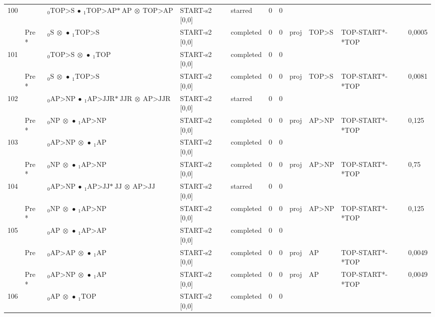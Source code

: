 \documentclass[10pt]{article}
\begin{document}
\begin{longtable}[htbp]{lllllllllll}
100 & & $ {}_0 \textrm{TOP>S} \  \bullet \ {}_{1} \textrm{TOP>AP*} \ \textrm{AP} \  \otimes \ \textrm{TOP>AP} $ & START-s2 [0,0] & starred & 0 & 0 & & & & \\ 
 & Pre *& $ {}_0 \textrm{S} \  \otimes \  \bullet \ {}_{1} \textrm{TOP>S} $ & START-s2 [0,0] & completed & 0 & 0 & proj & TOP>S & TOP-START*-*TOP & 0,0005 \\ 
101 & & $ {}_0 \textrm{TOP>S} \  \otimes \  \bullet \ {}_{1} \textrm{TOP} $ & START-s2 [0,0] & completed & 0 & 0 & & & & \\ 
 & Pre *& $ {}_0 \textrm{S} \  \otimes \  \bullet \ {}_{1} \textrm{TOP>S} $ & START-s2 [0,0] & completed & 0 & 0 & proj & TOP>S & TOP-START*-*TOP & 0,0081 \\ 
102 & & $ {}_0 \textrm{AP>NP} \  \bullet \ {}_{1} \textrm{AP>JJR*} \ \textrm{JJR} \  \otimes \ \textrm{AP>JJR} $ & START-s2 [0,0] & starred & 0 & 0 & & & & \\ 
 & Pre *& $ {}_0 \textrm{NP} \  \otimes \  \bullet \ {}_{1} \textrm{AP>NP} $ & START-s2 [0,0] & completed & 0 & 0 & proj & AP>NP & TOP-START*-*TOP & 0,125 \\ 
103 & & $ {}_0 \textrm{AP>NP} \  \otimes \  \bullet \ {}_{1} \textrm{AP} $ & START-s2 [0,0] & completed & 0 & 0 & & & & \\ 
 & Pre *& $ {}_0 \textrm{NP} \  \otimes \  \bullet \ {}_{1} \textrm{AP>NP} $ & START-s2 [0,0] & completed & 0 & 0 & proj & AP>NP & TOP-START*-*TOP & 0,75 \\ 
104 & & $ {}_0 \textrm{AP>NP} \  \bullet \ {}_{1} \textrm{AP>JJ*} \ \textrm{JJ} \  \otimes \ \textrm{AP>JJ} $ & START-s2 [0,0] & starred & 0 & 0 & & & & \\ 
 & Pre *& $ {}_0 \textrm{NP} \  \otimes \  \bullet \ {}_{1} \textrm{AP>NP} $ & START-s2 [0,0] & completed & 0 & 0 & proj & AP>NP & TOP-START*-*TOP & 0,125 \\ 
105 & & $ {}_0 \textrm{AP} \  \otimes \  \bullet \ {}_{1} \textrm{AP>AP} $ & START-s2 [0,0] & completed & 0 & 0 & & & & \\ 
 & Pre & $ {}_0 \textrm{AP>AP} \  \otimes \  \bullet \ {}_{1} \textrm{AP} $ & START-s2 [0,0] & completed & 0 & 0 & proj & AP & TOP-START*-*TOP & 0,0049 \\ 
 & Pre *& $ {}_0 \textrm{AP>NP} \  \otimes \  \bullet \ {}_{1} \textrm{AP} $ & START-s2 [0,0] & completed & 0 & 0 & proj & AP & TOP-START*-*TOP & 0,0049 \\ 
106 & & $ {}_0 \textrm{AP} \  \otimes \  \bullet \ {}_{1} \textrm{TOP} $ & START-s2 [0,0] & completed & 0 & 0 & & & & \\ 

\end{longtable}
\end{document}
